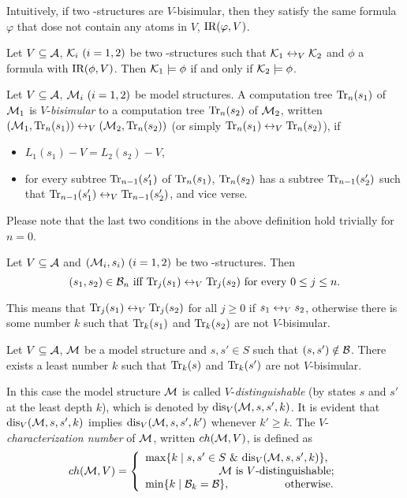 \documentclass{article}
\begin{document}
Intuitively, if two \MPK-structures are $V$-bisimular, then they satisfy the same formula $\varphi$ that dose not contain any atoms in $V$, \ie $\textrm{IR}(\varphi, V)$.
\begin{theorem}\label{thm:V-bisimulation:EQ}
  Let $V\subseteq\cal A$, ${\cal K}_i~(i=1,2)$ be two \MPK-structures such that
  ${\cal K}_1\leftrightarrow_V{\cal K}_2$ and $\phi$ a formula with $\textrm{IR}(\phi,V)$. Then
  ${\cal K}_1\models\phi$ if and only if ${\cal K}_2\models\phi$.
\end{theorem}


Let $V\subseteq\cal A$, ${\cal M}_i~(i=1,2)$ be  model structures.
A computation tree $\textrm{Tr}_n(s_1)$ of ${\cal M}_1$ is $V$-{\em bisimular}
to a computation tree $\textrm{Tr}_n(s_2)$ of ${\cal M}_2$, written
$({\cal M}_1,\textrm{Tr}_n(s_1))\leftrightarrow_V({\cal M}_2,\textrm{Tr}_n(s_2))$ (or simply
$\textrm{Tr}_n(s_1)\leftrightarrow_V\textrm{Tr}_n(s_2)$), if %
\begin{itemize}
  \item $L_1(s_1)-V=L_2(s_2)-V$,
  \item for every subtree $\textrm{Tr}_{n-1}(s_1')$ of $\textrm{Tr}_n(s_1)$,
  $\textrm{Tr}_n(s_2)$ has a subtree $\textrm{Tr}_{n-1}(s_2')$ such that
  $\textrm{Tr}_{n-1}(s_1')\leftrightarrow_V\textrm{Tr}_{n-1}(s_2')$, and vice verse.
\end{itemize}
Please note that the last two conditions in the above definition
hold trivially for $n=0$.

\begin{proposition}\label{B_to_T}
  Let $V\subseteq\cal A$ and $({\cal M}_i,s_i)~(i=1,2)$ be two \MPK-structures.
  Then
  \[(s_1,s_2)\in{\cal B}_n\mbox{ iff }
  \textrm{Tr}_j(s_1)\leftrightarrow_V\textrm{Tr}_j(s_2)\mbox{ for every $0\le j\le n$}.\]
\end{proposition}
This means that $\textrm{Tr}_j(s_1) \leftrightarrow_V \textrm{Tr}_j(s_2)$ for all $j \geq 0$ if $s_1 \leftrightarrow_V s_2$, otherwise there is some number $k$ such that $\textrm{Tr}_k(s_1)$ and $\textrm{Tr}_k(s_2)$ are not $V$-bisimular.

\begin{proposition}\label{pro:k}
  Let $V\subseteq {\cal A}$, ${\cal M}$ be a model structure and $s,s'\in S$
  such that $(s,s')\notin \cal B$.
  There exists a least number $k$ such that
  $\textrm{Tr}_k(s)$ and $\textrm{Tr}_k(s')$ are not $V$-bisimular.
\end{proposition}
In this case the  model structure ${\cal M}$ is called $V$-{\em distinguishable} (by
states $s$ and $s'$ at the least depth $k$), which is denoted by $\textrm{dis}_V({\cal M},s,s',k)$.
It is evident that
$\textrm{dis}_V({\cal M},s,s',k)$ implies $\textrm{dis}_V({\cal M},s,s',k')$ whenever $k'\ge k$.
The $V$-{\em characterization number}
of ${\cal M}$, written $ch({\cal M},V)$, is defined as
\[ch({\cal M},V)=
\left\{
  \begin{array}{ll}
    \max\{k\mid s,s'\in S\ \&\ \textrm{dis}_V({\cal M},s,s',k)\},\\
         \ \ \qquad \qquad \qquad \hbox{${\cal M}$ is $V$-distinguishable;} \\
    \min\{k\mid {\cal B}_{k}={\cal B}\}, \ \ \ \qquad \qquad \hbox{otherwise.}
  \end{array}
\right.
\]
\end{document}
